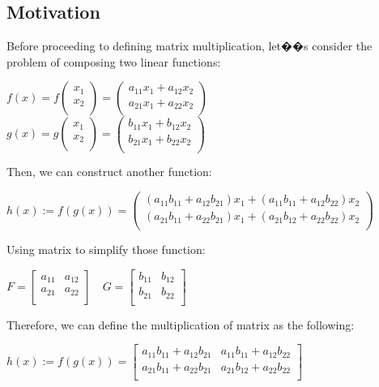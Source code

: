\documentclass[UTF8,a4paper, 10pt, openany]{book}
\begin{document}
\subsection{Motivation}
Before proceeding to defining matrix multiplication, let��s consider the problem of composing two linear functions:
\begin{center}
$f(x)=f
\left(
\begin{array}{c}
x_{1} \\ 
x_{2} \\
\end{array}
\right)=
\left(
\begin{array}{c}
a_{11}x_1+a_{12}x_{2} \\ 
a_{21}x_1+a_{22}x_{2} \\
\end{array}
\right)
$\\
$
g(x)=g
\left(
\begin{array}{c}
x_{1} \\ 
x_{2} \\
\end{array}
\right)=
\left(
\begin{array}{c}
b_{11}x_1+b_{12}x_{2} \\ 
b_{21}x_1+b_{22}x_{2} \\
\end{array}
\right)
$
\end{center}
Then, we can construct another function:
\begin{center}
$h(x):=
f(g(x))=
\left(
\begin{array}{c}
(a_{11}b_{11}+a_{12}b_{21})x_1+(a_{11}b_{11}+a_{12}b_{22})x_{2} \\ 
(a_{21}b_{11}+a_{22}b_{21})x_1+(a_{21}b_{12}+a_{22}b_{22})x_{2} \\
\end{array}
\right)
$
\end{center}
Using matrix to simplify those function:
\begin{center}
$F=
\left[
\begin{array}{cc}
a_{11} & a_{12} \\ 
a_{21} & a_{22} \\
\end{array}
\right] \quad
G=
\left[
\begin{array}{cc}
b_{11} & b_{12} \\ 
b_{21} & b_{22} \\
\end{array}
\right]
$
\end{center}
Therefore, we can define the multiplication of matrix as the following:
\begin{center}
$h(x):=
f(g(x))=
\left[
\begin{array}{cc}
a_{11}b_{11}+a_{12}b_{21} & a_{11}b_{11}+a_{12}b_{22} \\ 
a_{21}b_{11}+a_{22}b_{21} & a_{21}b_{12}+a_{22}b_{22} \\
\end{array}
\right]
$
\end{center}
\end{document}

